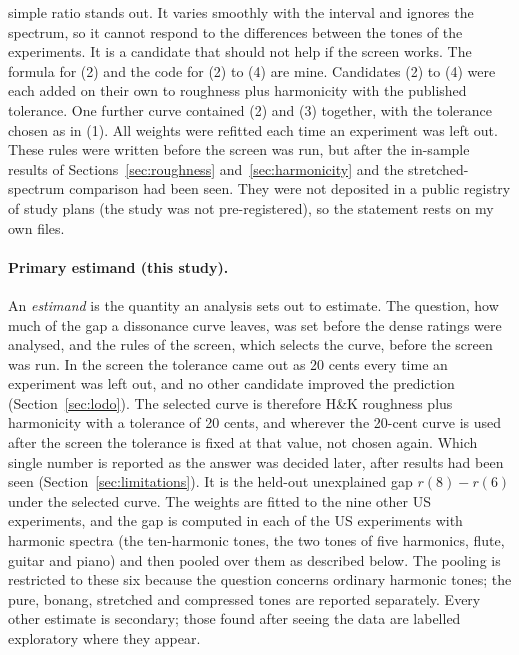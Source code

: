 \documentclass[11pt,a4paper]{article}
\newcommand{\HK}{H\&K}
\begin{document}
simple ratio stands out. It varies smoothly with the interval and ignores the spectrum, so
it cannot respond to the differences between the tones of the experiments. It is a candidate
that should not help if the screen works. The formula
for (2) and the code for (2) to (4) are mine. Candidates (2) to (4) were each added on their own to
roughness plus harmonicity with the published tolerance. One further curve contained (2) and
(3) together, with the tolerance chosen as in (1). All weights were refitted each time an experiment was left out. These rules were written
before the screen was run, but after the in-sample results of Sections~\ref{sec:roughness}
and~\ref{sec:harmonicity} and the stretched-spectrum comparison had been seen. They were not
deposited in a public registry of study plans (the study was not pre-registered), so the
statement rests on my own files.

\paragraph{Primary estimand (this study).}
An \emph{estimand} is the quantity an analysis sets out to estimate. The question, how much of the gap a dissonance curve leaves, was set before the dense
ratings were analysed, and the rules of the screen, which selects the curve, before the
screen was run. In the screen the tolerance came out as 20 cents every
time an experiment was left out, and no other candidate improved the prediction
(Section~\ref{sec:lodo}). The selected curve is therefore \HK{} roughness plus harmonicity
with a tolerance of 20 cents, and wherever the 20-cent curve is used after the screen the tolerance is
fixed at that value, not chosen again. Which single number is reported as the answer was decided later, after results had been
seen (Section~\ref{sec:limitations}). It is the held-out unexplained gap $r(8)-r(6)$ under the
selected curve. The weights are fitted to the nine other US experiments, and the gap is
computed in each of the \primK{} US experiments with harmonic spectra (the ten-harmonic tones, the two tones of five harmonics, flute, guitar and piano) and then pooled over them as
described below. The pooling is restricted to these six because the question concerns
ordinary harmonic tones; the pure, bonang, stretched and compressed tones are reported
separately. Every other estimate is secondary; those found after seeing the data are
labelled exploratory where they appear.
\end{document}
